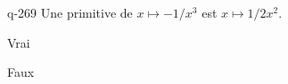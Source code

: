 \begin{truefalse}{q-269}
Une primitive de $x\mapsto -1/x^3$ est $x\mapsto 1/2x^2$.
\item* Vrai
\item Faux
\end{truefalse}

